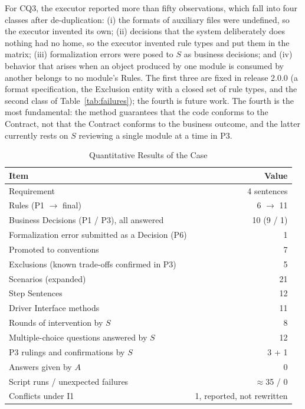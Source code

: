 \documentclass[conference]{IEEEtran}
\begin{document}
For CQ3, the executor reported more than fifty observations, which fall into four classes after de-duplication: (i) the formats of auxiliary files were undefined, so the executor invented its own; (ii) decisions that the system deliberately does nothing had no home, so the executor invented rule types and put them in the matrix; (iii) formalization errors were posed to $S$ as business decisions; and (iv) behavior that arises when an object produced by one module is consumed by another belongs to no module's Rules. The first three are fixed in release 2.0.0 (a format specification, the Exclusion entity with a closed set of rule types, and the second class of Table~\ref{tab:failures}); the fourth is future work. The fourth is the most fundamental: the method guarantees that the code conforms to the Contract, not that the Contract conforms to the business outcome, and the latter currently rests on $S$ reviewing a single module at a time in P3.

\begin{table}[t]
\caption{Quantitative Results of the Case}\label{tab:casenumbers}
\centering\footnotesize
\begin{tabularx}{\columnwidth}{@{}Lr@{}}
\toprule
Item & Value \\
\midrule
Requirement & 4 sentences \\
Rules (P1 $\rightarrow$ final) & 6 $\rightarrow$ 11 \\
Business Decisions (P1 / P3), all answered & 10 (9 / 1) \\
Formalization error submitted as a Decision (P6) & 1 \\
Promoted to conventions & 7 \\
Exclusions (known trade-offs confirmed in P3) & 5 \\
Scenarios (expanded) & 21 \\
Step Sentences & 12 \\
Driver Interface methods & 11 \\
Rounds of intervention by $S$ & 8 \\
Multiple-choice questions answered by $S$ & 12 \\
P3 rulings and confirmations by $S$ & 3 + 1 \\
Answers given by $A$ & 0 \\
Script runs / unexpected failures & $\approx$35 / 0 \\
Conflicts under I1 & 1, reported, not rewritten \\
\bottomrule
\end{tabularx}
\end{table}
\end{document}
